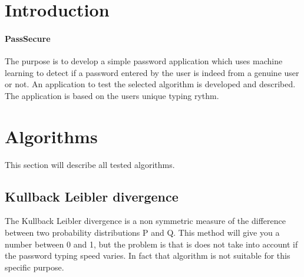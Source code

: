 \documentclass[fleqn,10pt]{SelfArx} %
\begin{document}
\flushbottom %

\maketitle %

\tableofcontents %

\thispagestyle{empty} %


\section*{Introduction} %


\paragraph{PassSecure}The purpose is to develop a simple password application which uses machine learning to detect if a password entered by the user is indeed from a genuine user or not. An application to test the selected algorithm is developed and described. The application is based on the users unique typing rythm.


\section{Algorithms}

This section will describe all tested algorithms.

\subsection{Kullback Leibler divergence}
The Kullback Leibler divergence is a non symmetric measure of the difference between two probability distributions P and Q.\cite{kullback} This method will give you a number between 0 and 1, but the problem is that is does not take into account if the password typing speed varies. In fact that algorithm is not suitable for this specific purpose.
\end{document}

